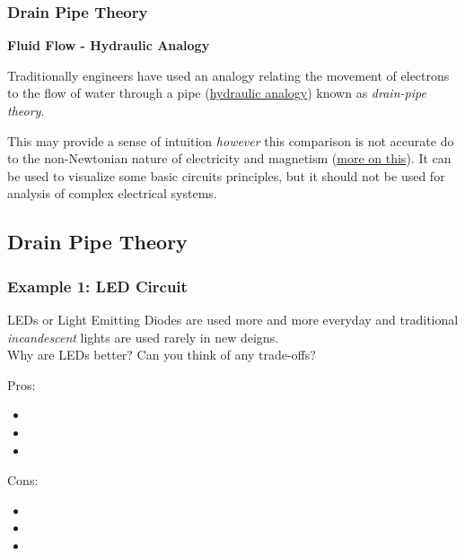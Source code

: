 \documentclass[fleqn]{beamer} %
\newcommand{\sectionIIIsubsectionIItitle}{Drain Pipe Theory}
\newcommand{\sectionIIIsubsectionIIItitle}{Example 1: LED Circuit}
\begin{document}
			\begin{frame}
				\frametitle{\sectionIIIsubsectionIItitle}

				{\bf Fluid Flow - Hydraulic Analogy} \vspc
	
				Traditionally engineers have used an analogy relating the movement of electrons to the flow of water through a pipe (\href{https://en.wikipedia.org/wiki/Hydraulic_analogy}{\BL hydraulic analogy}) known as {\it drain-pipe theory}. \vspace{5mm}
				
				This may provide a sense of intuition {\it however} this comparison is not accurate do to the non-Newtonian nature of electricity and magnetism (\href{https://www.slideshare.net/PDiCEOThaneHeins3240/georgia-state-university-hyperphysics-how-newtonian-mechanics-is-incorrectly-being-applied-to-explain-the-laws-of-electricity-and-magnetism}{\GR more on this}). It can  be used to visualize some basic circuits principles, but it should not be used for analysis of complex electrical systems. 

			\end{frame}

		\subsection{\sectionIIIsubsectionIItitle}\label{sectionIIIsubsectionIII}

			\begin{frame}
				\frametitle{\sectionIIIsubsectionIIItitle}

				LEDs or Light Emitting Diodes are used more and more everyday and traditional {\it incandescent} lights are used rarely in new deigns.\\
				Why are LEDs better? Can you think of any trade-offs? \\

				\begin{multicols}{2}
					Pros:
					\begin{itemize}
						\item 
						\item
						\item
					\end{itemize}
					Cons:
					\begin{itemize}
						\item 
						\item
						\item
					\end{itemize}
				\end{multicols}

			\end{frame}
\end{document}
